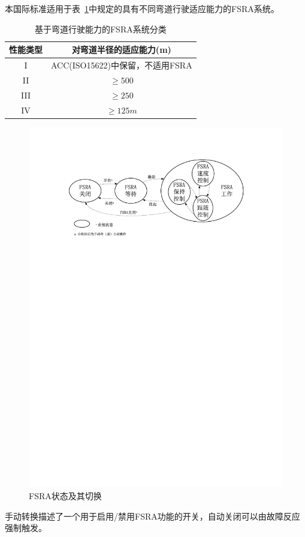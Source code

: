 \documentclass[is,copyright,is]{isov2}
\begin{document}
本国际标准适用于表~\ref{tab:ACCperformancespec}中规定的具有不同弯道行驶适应能力的FSRA系统。
\begin{table}[htbp]
	\centering
	\caption{基于弯道行驶能力的FSRA系统分类}
	\begin{tabular}{|c|c|}
		\hline
		性能类型    &对弯道半径的适应能力(m) \\
		\hline
		I    & ACC(ISO15622)中保留，不适用FSRA  \\
		\hline
		II    & $\geq 500 $   \\
		\hline
		III    & $\geq 250 $   \\
		\hline
		IV    &  $\geq 125 m$   \\
		\hline
	\end{tabular}%
	\label{tab:ACCperformancespec}%
\end{table}%

\begin{figure}[htbp]
	\centering
	\includegraphics[width=0.7\linewidth]{figures/FSRAmode}
	\caption{FSRA状态及其切换}
	\label{fig:fsramode}
\end{figure}

\begin{anote}
	手动转换描述了一个用于启用/禁用FSRA功能的开关，自动关闭可以由故障反应强制触发。
\end{anote}
\end{document}
